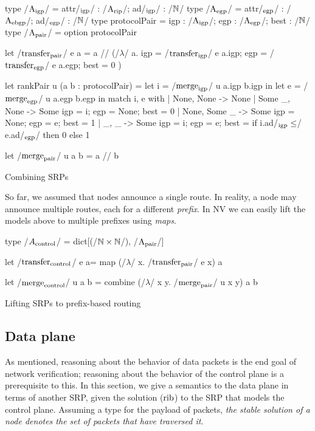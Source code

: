 \documentclass[sigconf,10pt]{acmart}
\begin{document}
\begin{listing}[ht]
  \begin{ocamlcode}
    type /$\A_{\igp}$/ = { attr/$_{\igp}$/ : /$\A_{\rip}$/; ad/$_{\igp}$/ : /$\nat$/}
    type /$\A_{\egp}$/ = { attr/$_{\egp}$/ : /$\A_{\ebgp}$/; ad/$_{\egp}$/ : /$\nat$/}
    type protocolPair = { igp : /$\A_{\igp}$/; egp : /$\A_{\egp}$/; best : /$\nat$/}
    type /$\A_{\pair}$/ = option protocolPair

    let /$\transfer_{\pair}$/ e a =
      a /\bind/
        (/$\lambda$/ a. 
           { igp  = /$\transfer_{\igp}$/ e a.igp;
             egp = /$\transfer_{\egp}$/ e a.egp;
             best = 0
           })

     let rankPair u (a b : protocolPair) =
       let i = /$\merge_{\igp}$/ u a.igp b.igp in
       let e = /$\merge_{\egp}$/ u a.egp b.egp in
       match i, e with
       | None, None -> None
       | Some _, None -> 
         Some { igp = i; egp = None; best = 0 }
       | None, Some _ -> 
         Some { igp = None; egp = e; best = 1 }
       | _, _ ->
         Some { igp = i; egp = e; best = if i.ad/$_{\igp} \leq $/ e.ad/$_{\egp}$/ then 0 else 1 }
           
     let /$\merge_{\pair}$/ u a b = a // b
\end{ocamlcode}
\caption{Combining SRPs}
\label{lst:pair-srp}
\end{listing}

So far, we assumed that nodes announce a single route. In
reality, a node may announce multiple routes, each for a different
\emph{prefix}. In NV we can easily lift the models above to multiple
prefixes using \emph{maps}.


\begin{listing}[ht]
  \begin{ocamlcode}
    type /$A_{\control}$/ = dict[(/$\nat \times \nat$/), /$\A_{\pair}$/]

    let /$\transfer_{\control}$/ e a=
      map (/$\lambda$/ x. /$\transfer_{\pair}$/ e x) a

    let /$\merge_{\control}$/ u a b =
      combine (/$\lambda$/ x y. /$\merge_{\pair}$/ u x y) a b     
\end{ocamlcode}
\caption{Lifting SRPs to prefix-based routing}
\label{lst:lifted-srp}
\end{listing}

\subsection{Data plane}
As mentioned, reasoning about the behavior of data packets is the end
goal of network verification; reasoning about the behavior of the
control plane is a prerequisite to this. In this section, we give a
semantics to the data plane in terms of another SRP, given the
solution ($\mathrm{rib}$) to the SRP that models the control plane. Assuming a type
for the payload of packets, \emph{the stable solution of a node denotes the set of packets
that have traversed it}.
\end{document}
